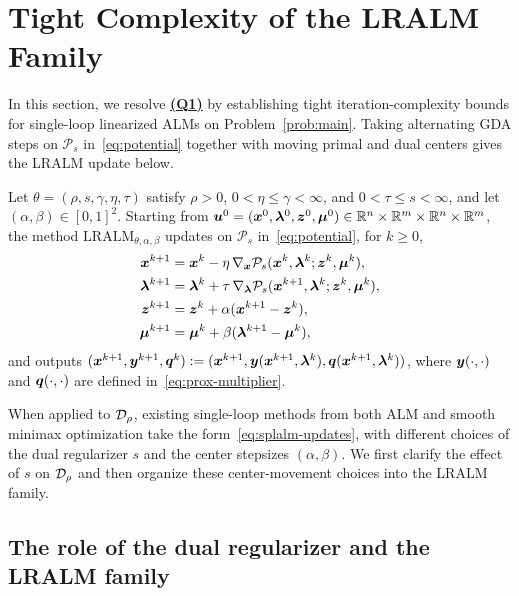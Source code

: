 \section{Tight Complexity of the LRALM Family}
\label{sec:algorithm-framework}

In this section, we resolve \hyperlink{Q1}{\textbf{(Q1)}} by establishing tight
iteration-complexity bounds for single-loop linearized ALMs on
Problem~\eqref{prob:main}. Taking alternating GDA steps on \(\mathcal P_s\)
in~\eqref{eq:potential} together with moving primal and dual centers gives the
LRALM update below.
 
\begin{definition}
\label{def:splalm}
Let \(\theta=(\rho,s,\gamma,\eta,\tau)\) satisfy \(\rho>0\),
\(0<\eta\le\gamma<\infty\), and \(0<\tau\le s<\infty\), and let
\((\alpha,\beta)\in[0,1]^2\). Starting from
\(\bm{u}^0=(\bm{x}^0,\bm{\lambda}^0,\bm{z}^0,\bm{\mu}^0)\in\mathbb{R}^n\times\mathbb{R}^m\times\mathbb{R}^n\times\mathbb{R}^m\),
the method \(\mathrm{LRALM}_{\theta,\alpha,\beta}\) updates on \(\mathcal P_s\)
in~\eqref{eq:potential}, for \(k\ge0\),
\begin{equation}
\begin{aligned}
    \bm{x}^{k+1}&=\bm{x}^k-\eta\,\nabla_{\bm{x}}\mathcal P_s(\bm{x}^k,\bm{\lambda}^k;\bm{z}^k,\bm{\mu}^k),\\
    \bm{\lambda}^{k+1}&=\bm{\lambda}^k+\tau\,\nabla_{\bm{\lambda}}\mathcal P_s(\bm{x}^{k+1},\bm{\lambda}^k;\bm{z}^k,\bm{\mu}^k),\\
    \bm{z}^{k+1}&=\bm{z}^k+\alpha(\bm{x}^{k+1}-\bm{z}^k),\\
    \bm{\mu}^{k+1}&=\bm{\mu}^k+\beta(\bm{\lambda}^{k+1}-\bm{\mu}^k), 
\end{aligned}
    \label{eq:splalm-updates}
\end{equation}
and outputs
\((\bm{x}^{k+1},\bm{y}^{k+1},\bm{q}^k)
:=(\bm{x}^{k+1},\bm{y}(\bm{x}^{k+1},\bm{\lambda}^k),\bm{q}(\bm{x}^{k+1},\bm{\lambda}^k))\), where
\(\bm{y}(\cdot,\cdot)\) and \(\bm{q}(\cdot,\cdot)\) are defined
in~\eqref{eq:prox-multiplier}.
\end{definition} 

When applied to \(\mathcal{D}_\rho\), existing single-loop methods from both ALM
and smooth minimax optimization take the form~\eqref{eq:splalm-updates},
with different choices of the dual regularizer \(s\) and the center
stepsizes \((\alpha,\beta)\). We first clarify the effect of \(s\) on
\(\mathcal{D}_\rho\) and then organize these center-movement choices into the LRALM
family.

\subsection{The role of the dual regularizer and the LRALM family}
\label{subsec:lralm-family}

